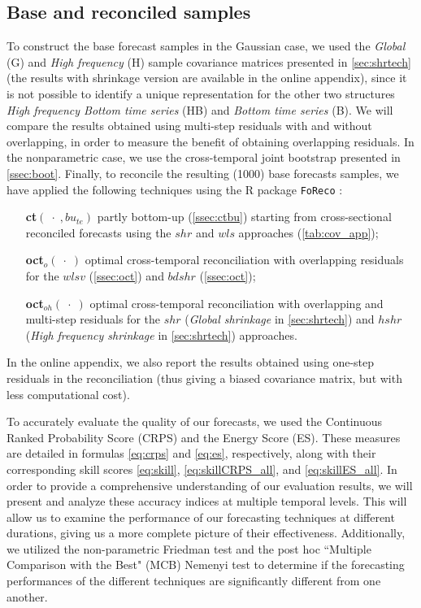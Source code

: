 \documentclass[a4paper,11pt]{article}
\theoremstyle{definition}
\begin{document}
\subsection{Base and reconciled samples}\label{ssec:aus_br}

To construct the base forecast samples in the Gaussian case, we used the \textit{Global} (G) and \textit{High frequency} (H) sample covariance matrices presented in \autoref{sec:shrtech} (the results with shrinkage version are available in the online appendix), since it is not possible to identify a unique representation \citep{giro2022} for the other two structures \textit{High frequency Bottom time series} (HB) and \textit{Bottom time series} (B). We will compare the results obtained using multi-step residuals with and without overlapping, in order to measure the benefit of obtaining overlapping residuals. In the nonparametric case, we use the cross-temporal joint bootstrap presented in \autoref{ssec:boot}.
Finally, to reconcile the resulting (1000) base forecasts samples, we have applied the following techniques using the R package \texttt{FoReco} \citep{foreco2023}:
\begin{itemize}[nosep, leftmargin = 2.5cm]
	\item[\textbf{ct}$(\;\cdot\;, bu_{te})$] partly bottom-up (\autoref{ssec:ctbu}) starting from cross-sectional reconciled forecasts using the $shr$ and $wls$ approaches (\autoref{tab:cov_app});
	\item[\textbf{oct}$_o(\;\cdot\;)$] optimal cross-temporal reconciliation with overlapping residuals for the $wlsv$ (\autoref{ssec:oct}) and $bdshr$ (\autoref{ssec:oct});
	\item[\textbf{oct}$_{oh}(\;\cdot\;)$] optimal cross-temporal reconciliation with overlapping and multi-step residuals for the $shr$ (\textit{Global shrinkage} in \autoref{sec:shrtech}) and $hshr$ (\textit{High frequency shrinkage} in \autoref{sec:shrtech}) approaches.
\end{itemize}
In the online appendix, we also report the results obtained using one-step residuals in the reconciliation (thus giving a biased covariance matrix, but with less computational cost).

To accurately evaluate the quality of our forecasts, we used the Continuous Ranked Probability Score (CRPS) and the Energy Score (ES). These measures are detailed in formulas \eqref{eq:crps} and \eqref{eq:es}, respectively, along with their corresponding skill scores \eqref{eq:skill}, \eqref{eq:skillCRPS_all}, and \eqref{eq:skillES_all}.
In order to provide a comprehensive understanding of our evaluation results, we will present and analyze these accuracy indices at multiple temporal levels. This will allow us to examine the performance of our forecasting techniques at different durations, giving us a more complete picture of their effectiveness.
Additionally, we utilized the non-parametric Friedman test and the post hoc “Multiple Comparison with the Best" (MCB) Nemenyi test \citep{koning2005, kourentzes2019, makridakis2022} to determine if the forecasting performances of the different techniques are significantly different from one another.
\end{document}
